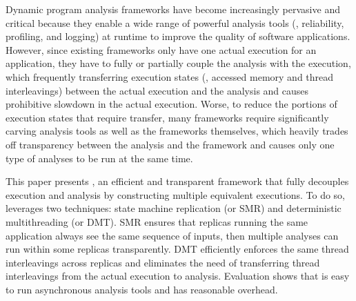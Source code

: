 
Dynamic program analysis frameworks have become increasingly pervasive and 
critical because they enable a wide range of powerful analysis tools (\eg, 
reliability, profiling, and logging) at runtime to improve the quality of 
software applications. However, since existing frameworks only have one actual 
execution for an application, they have to fully or partially couple the 
analysis with the execution, which frequently transferring execution states 
(\eg, accessed memory and thread interleavings) between the actual execution 
and the analysis and causes prohibitive slowdown in the actual execution. 
Worse, to reduce the portions of execution states that require transfer, many 
frameworks require significantly carving analysis tools as well as the 
frameworks themselves, which heavily trades off transparency between the 
analysis and the framework and causes only one type of analyses to be run at 
the same time.


This paper presents \xxx, an efficient and transparent framework that fully 
decouples execution and analysis by constructing multiple equivalent 
executions. To do so, \xxx leverages two techniques: state machine replication 
(or SMR) and deterministic multithreading (or DMT). SMR ensures that replicas 
running the same application always see the same sequence of inputs, then 
multiple analyses can run within some replicas transparently. DMT efficiently 
enforces the same thread interleavings across replicas and eliminates the need 
of transferring thread interleavings from the actual execution to analysis. 
Evaluation shows that \xxx is easy to run asynchronous analysis tools and has 
reasonable overhead.